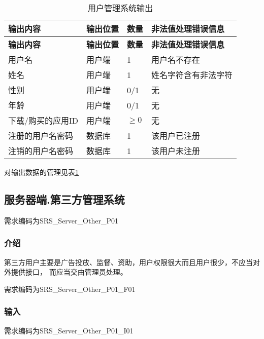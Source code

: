 \begin{longtable}{|p{3cm}|p{4cm}|p{1cm}|p{6cm}|}
\caption{用户管理系统输出}\label{tab:concrete_user_sys_output} \\
\hline
\textbf{输出内容} & \textbf{输出位置} & \textbf{数量}  & \textbf{非法值处理错误信息}    \\
\hline
\endfirsthead
\hline
\textbf{输出内容} & \textbf{输出位置} & \textbf{数量}  & \textbf{非法值处理错误信息}  \\
\hline
\endhead
\hline 
\endfoot
\hline
\endlastfoot
用户名 & 用户端 & 1 & 用户名不存在\\
姓名 & 用户端 & 1 & 姓名字符含有非法字符\\
性别 & 用户端 & 0/1 & 无\\
年龄 & 用户端 & 0/1 & 无\\
下载/购买的应用ID & 用户端 & $\ge 0$ & 无\\
注册的用户名密码 & 数据库 & 1 & 该用户已注册\\
注销的用户名密码 & 数据库 & 1 & 该用户未注册 \\
\end{longtable}
	
对输出数据的管理见表\ref{tab:concrete_user_sys_output}

\subsection{服务器端.第三方管理系统}

需求编码为SRS\_Server\_Other\_P01
\subsubsection{介绍}
第三方用户主要是广告投放、监督、资助，用户权限很大而且用户很少，不应当对外提供接口，
而应当交由管理员处理。

需求编码为SRS\_Server\_Other\_P01\_F01

\subsubsection{输入}

需求编码为SRS\_Server\_Other\_P01\_I01

